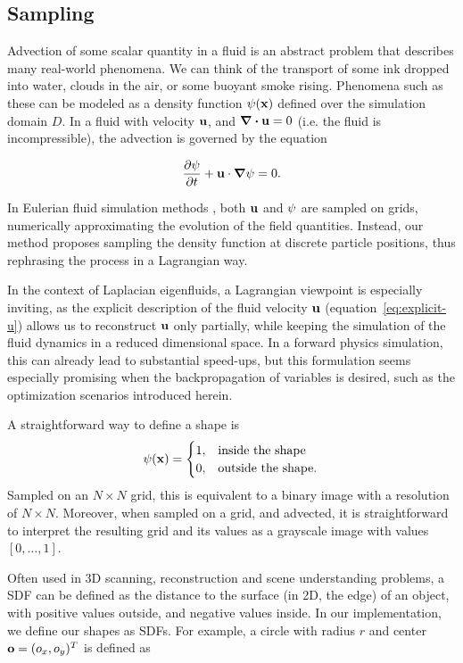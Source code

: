 \subsection{Sampling}\label{section:sampling}
Advection of some scalar quantity in a fluid is an abstract problem that
describes many real-world phenomena. We can think of the transport of some ink
dropped into water, clouds in the air, or some buoyant smoke rising. Phenomena
such as these can be modeled as a density function $\psi(\vb{x})$ defined over
the simulation domain $D$. In a fluid with velocity $\vb{u}$, and $\div{\vb{u}}
= 0$ (i.e. the fluid is incompressible), the advection is governed by the
equation

$$\pdv{\psi}{t} + \vb{u}\cdot \grad{\psi} = 0.$$

In Eulerian fluid simulation methods \cite{StableFluids}, both
$\vb{u}$ and $\vb{\psi}$ are sampled on grids, numerically approximating the
evolution of the field quantities. Instead, our method proposes sampling the
density function at discrete particle positions, thus rephrasing the process in
a Lagrangian way.

In the context of Laplacian eigenfluids, a Lagrangian viewpoint is especially
inviting, as the explicit description of the fluid velocity $\vb{u}$
(equation~\eqref{eq:explicit-u}) allows us to reconstruct $\vb{u}$ only
partially, while keeping the simulation of the fluid dynamics in a reduced
dimensional space. In a forward physics simulation, this can already lead to
substantial speed-ups, but this formulation seems especially promising when the
backpropagation of variables is desired, such as the optimization scenarios
introduced herein.

A straightforward way to define a shape is
\begin{equation}\label{eq:binary-shape-function}
\psi(\vb{x}) = 
\begin{cases}
  1, & \qq*{inside the shape}\\
  0, & \text{outside the shape}.\\
\end{cases}
\end{equation}
Sampled on an $N \times N$ grid, this is equivalent to a binary image with
a resolution of $N \times N$. Moreover, when sampled on a grid, and advected,
it is straightforward to interpret the resulting grid and its values as
a grayscale image with values $[0,\dots,1]$.

Often used in 3D scanning, reconstruction and scene understanding problems,
a \acf{SDF} can be defined as the distance to the surface (in 2D, the edge) of
an object, with positive values outside, and negative values inside. In our
implementation, we define our shapes as \acp{SDF}. For example, a circle with
radius $r$ and center $\vb{o} = (o_x, o_y)^T$ is defined as

